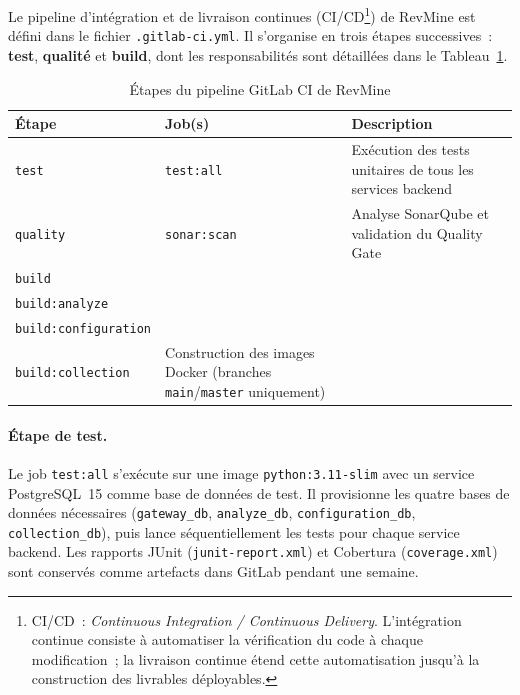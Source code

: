 Le pipeline d'intégration et de livraison continues (CI/CD\footnote{CI/CD~: \textit{Continuous
Integration / Continuous Delivery}. L'intégration continue consiste à automatiser la vérification
du code à chaque modification~; la livraison continue étend cette automatisation jusqu'à la
construction des livrables déployables.}) de RevMine est défini dans le fichier
\texttt{.gitlab-ci.yml}. Il s'organise en trois étapes successives~: \textbf{test},
\textbf{qualité} et \textbf{build}, dont les responsabilités sont détaillées dans le
Tableau~\ref{tab:pipeline-ci}.

\begin{table}[H]
\centering
\small
\caption{Étapes du pipeline GitLab CI de RevMine}
\label{tab:pipeline-ci}
\begin{tabular}{|>{\raggedright\arraybackslash}p{2cm}
                |>{\raggedright\arraybackslash}p{4.5cm}
                |>{\raggedright\arraybackslash}p{6.5cm}|}
\hline
\textbf{Étape} & \textbf{Job(s)} & \textbf{Description} \\
\hline
\texttt{test} & \texttt{test:all} & Exécution des tests unitaires de tous les services backend \\
\hline
\texttt{quality} & \texttt{sonar:scan} & Analyse SonarQube et validation du Quality Gate \\
\hline
\texttt{build} & \makecell[l]{\texttt{build:api-gateway} \\ \texttt{build:analyze} \\ \texttt{build:configuration} \\ \texttt{build:collection}} & Construction des images Docker (branches \texttt{main}/\texttt{master} uniquement) \\
\hline
\end{tabular}
\end{table}

\paragraph{Étape de test.} Le job \texttt{test:all} s'exécute sur une image
\texttt{python:3.11-slim} avec un service PostgreSQL~15 comme base de données de test. Il
provisionne les quatre bases de données nécessaires (\texttt{gateway\_db}, \texttt{analyze\_db},
\texttt{configuration\_db}, \texttt{collection\_db}), puis lance séquentiellement les tests pour
chaque service backend. Les rapports JUnit (\texttt{junit-report.xml}) et Cobertura
(\texttt{coverage.xml}) sont conservés comme artefacts dans GitLab pendant une semaine.

